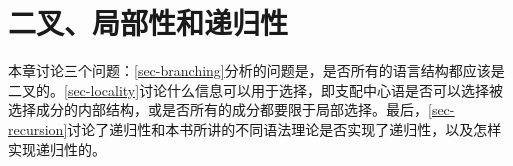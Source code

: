 
\chapter{二叉、局部性和递归性}
\label{Kapitel-Binarybranching-locality-recursion}

本章讨论三个问题：\ref{sec-branching}分析的问题是，是否所有的语言结构都应该是二叉的。\ref{sec-locality}讨论什么信息可以用于选择，即支配中心语是否可以选择被选择成分的内部结构，或是否所有的成分都要限于局部选择。最后，\ref{sec-recursion}讨论了递归性和本书所讲的不同语法理论是否实现了递归性，以及怎样实现递归性的。




